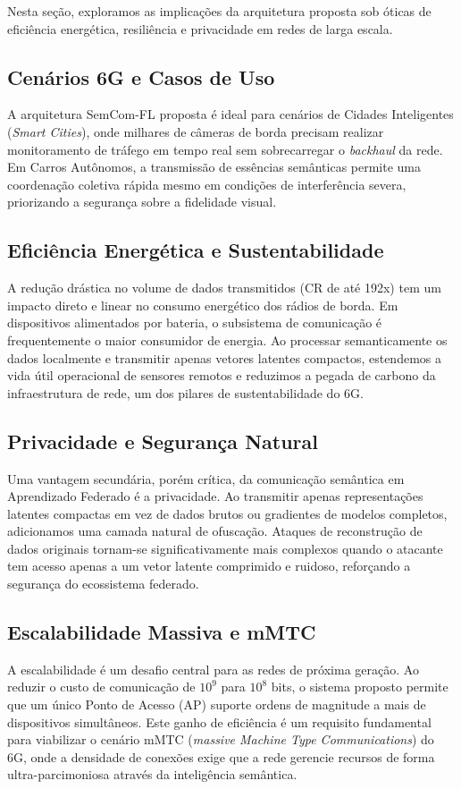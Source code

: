 \documentclass[conference]{IEEEtran}
\begin{document}
Nesta seção, exploramos as implicações da arquitetura proposta sob óticas de eficiência energética, resiliência e privacidade em redes de larga escala.

\subsection{Cenários 6G e Casos de Uso}
A arquitetura SemCom-FL proposta é ideal para cenários de Cidades Inteligentes (\textit{Smart Cities}), onde milhares de câmeras de borda precisam realizar monitoramento de tráfego em tempo real sem sobrecarregar o \textit{backhaul} da rede. Em Carros Autônomos, a transmissão de essências semânticas permite uma coordenação coletiva rápida mesmo em condições de interferência severa, priorizando a segurança sobre a fidelidade visual.

\subsection{Eficiência Energética e Sustentabilidade}
A redução drástica no volume de dados transmitidos (CR de até 192x) tem um impacto direto e linear no consumo energético dos rádios de borda. Em dispositivos alimentados por bateria, o subsistema de comunicação é frequentemente o maior consumidor de energia. Ao processar semanticamente os dados localmente e transmitir apenas vetores latentes compactos, estendemos a vida útil operacional de sensores remotos e reduzimos a pegada de carbono da infraestrutura de rede, um dos pilares de sustentabilidade do 6G.

\subsection{Privacidade e Segurança Natural}
Uma vantagem secundária, porém crítica, da comunicação semântica em Aprendizado Federado é a privacidade. Ao transmitir apenas representações latentes compactas em vez de dados brutos ou gradientes de modelos completos, adicionamos uma camada natural de ofuscação. Ataques de reconstrução de dados originais tornam-se significativamente mais complexos quando o atacante tem acesso apenas a um vetor latente comprimido e ruidoso, reforçando a segurança do ecossistema federado.

\subsection{Escalabilidade Massiva e mMTC}
A escalabilidade é um desafio central para as redes de próxima geração. Ao reduzir o custo de comunicação de $10^9$ para $10^8$ bits, o sistema proposto permite que um único Ponto de Acesso (AP) suporte ordens de magnitude a mais de dispositivos simultâneos. Este ganho de eficiência é um requisito fundamental para viabilizar o cenário mMTC (\textit{massive Machine Type Communications}) do 6G, onde a densidade de conexões exige que a rede gerencie recursos de forma ultra-parcimoniosa através da inteligência semântica.
\end{document}
